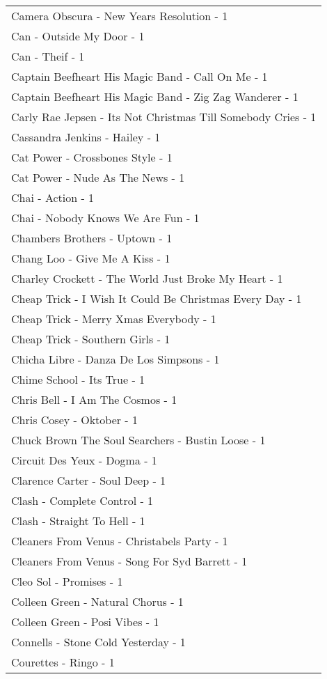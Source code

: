 \documentclass[
]{article}
\begin{document}
\begin{longtable}{l}
Camera Obscura - New Years Resolution - 1 \\ 
Can - Outside My Door - 1 \\ 
Can - Theif - 1 \\ 
Captain Beefheart His Magic Band - Call On Me - 1 \\ 
Captain Beefheart His Magic Band - Zig Zag Wanderer - 1 \\ 
Carly Rae Jepsen - Its Not Christmas Till Somebody Cries - 1 \\ 
Cassandra Jenkins - Hailey - 1 \\ 
Cat Power - Crossbones Style - 1 \\ 
Cat Power - Nude As The News - 1 \\ 
Chai - Action - 1 \\ 
Chai - Nobody Knows We Are Fun - 1 \\ 
Chambers Brothers - Uptown - 1 \\ 
Chang Loo - Give Me A Kiss - 1 \\ 
Charley Crockett - The World Just Broke My Heart - 1 \\ 
Cheap Trick - I Wish It Could Be Christmas Every Day - 1 \\ 
Cheap Trick - Merry Xmas Everybody - 1 \\ 
Cheap Trick - Southern Girls - 1 \\ 
Chicha Libre - Danza De Los Simpsons - 1 \\ 
Chime School - Its True - 1 \\ 
Chris Bell - I Am The Cosmos - 1 \\ 
Chris Cosey - Oktober - 1 \\ 
Chuck Brown The Soul Searchers - Bustin Loose - 1 \\ 
Circuit Des Yeux - Dogma - 1 \\ 
Clarence Carter - Soul Deep - 1 \\ 
Clash - Complete Control - 1 \\ 
Clash - Straight To Hell - 1 \\ 
Cleaners From Venus - Christabels Party - 1 \\ 
Cleaners From Venus - Song For Syd Barrett - 1 \\ 
Cleo Sol - Promises - 1 \\ 
Colleen Green - Natural Chorus - 1 \\ 
Colleen Green - Posi Vibes - 1 \\ 
Connells - Stone Cold Yesterday - 1 \\ 
Courettes - Ringo - 1 \\ 

\end{longtable}
\end{document}
